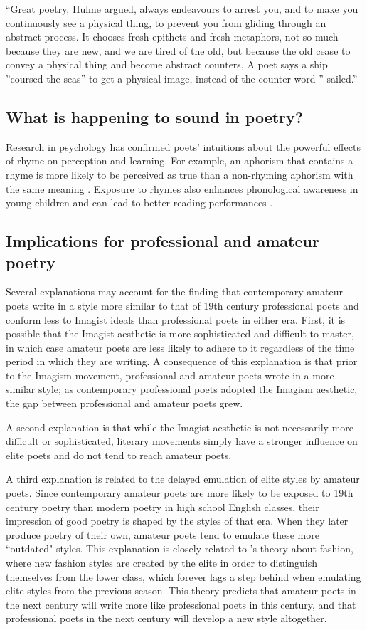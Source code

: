 \documentclass{book}
\begin{document}
``Great poetry, Hulme argued, always endeavours to arrest you, and to make you continuously see a physical thing, to prevent you from gliding through an abstract process. It chooses fresh epithets and fresh metaphors, not so much because they are new, and we are tired of the old, but because the old cease to convey a physical thing and become abstract counters, A poet says a ship ''coursed the seas'' to get a physical image, instead of the counter word '' sailed.'' 

\subsection{What is happening to sound in poetry?}

Research in psychology has confirmed poets' intuitions about the powerful effects of rhyme on perception and learning. For example, an aphorism that contains a rhyme is more likely to be perceived as true than a non-rhyming aphorism with the same meaning \citep{aphorisms}. Exposure to rhymes also enhances phonological awareness in young children and can lead to better reading performances \citep{reading}.

\subsection{Implications for professional and amateur poetry}
Several explanations may account for the finding that contemporary amateur poets write in a style more similar to that of 19th century professional poets and conform less to Imagist ideals than professional poets in either era. First, it is possible that the Imagist aesthetic is more sophisticated and difficult to master, in which case amateur poets are less likely to adhere to it regardless of the time period in which they are writing. A consequence of this explanation is that prior to the Imagism movement, professional and amateur poets wrote in a more similar style; as contemporary professional poets adopted the Imagism aesthetic, the gap between professional and amateur poets grew. 

A second explanation is that while the Imagist aesthetic is not necessarily more difficult or sophisticated, literary movements simply have a stronger influence on elite poets and do not tend to reach amateur poets.

A third explanation is related to the delayed emulation of elite styles by amateur poets. Since contemporary amateur poets are more likely to be exposed to 19th century poetry than modern poetry in high school English classes, their impression of good poetry is shaped by the styles of that era. When they later produce poetry of their own, amateur poets tend to emulate these more ``outdated" styles. This explanation is closely related to \cite{simmel1957fashion}'s theory about fashion, where new fashion styles are created by the elite in order to distinguish themselves from the lower class, which forever lags a step behind when emulating elite styles from the previous season. This theory predicts that amateur poets in the next century will write more like professional poets in this century, and that professional poets in the next century will develop a new style altogether.
\end{document}
